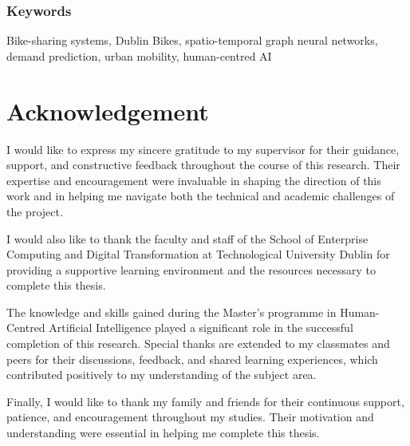 \documentclass[11pt]{report}
\begin{document}
\subsection*{Keywords}
Bike-sharing systems, Dublin Bikes, spatio-temporal graph neural networks, demand prediction, urban mobility, human-centred AI




\chapter*{Acknowledgement}
\thispagestyle{empty}
I would like to express my sincere gratitude to my supervisor for their guidance, support, and constructive feedback throughout the course of this research. Their expertise and encouragement were invaluable in shaping the direction of this work and in helping me navigate both the technical and academic challenges of the project.

I would also like to thank the faculty and staff of the School of Enterprise Computing and Digital Transformation at Technological University Dublin for providing a supportive learning environment and the resources necessary to complete this thesis.

The knowledge and skills gained during the Master’s programme in Human-Centred Artificial Intelligence played a significant role in the successful completion of this research. Special thanks are extended to my classmates and peers for their discussions, feedback, and shared learning experiences, which contributed positively to my understanding of the subject area.

Finally, I would like to thank my family and friends for their continuous support, patience, and encouragement throughout my studies. Their motivation and understanding were essential in helping me complete this thesis.

\tableofcontents
\setcounter{page}{1}
\thispagestyle{plain}


\end{document}

